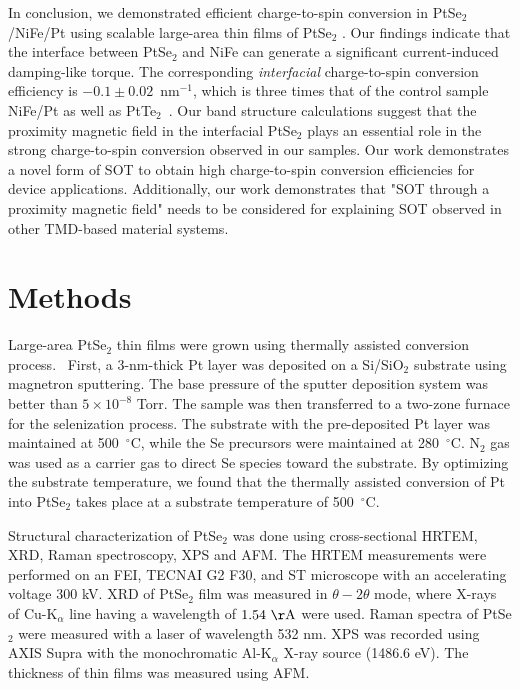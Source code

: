 \documentclass[journal=jacsat,manuscript=article]{achemso}
\begin{document}
In conclusion, we demonstrated efficient charge-to-spin conversion in PtSe$_{2}$/NiFe/Pt using scalable large-area thin films of PtSe$_{2}$ .
Our findings indicate that the interface between PtSe$_{2}$ and NiFe can generate a significant current-induced damping-like torque. The corresponding \textit{interfacial} charge-to-spin conversion efficiency is $-0.1\pm 0.02$~nm$^{-1}$, which is three times that of the control sample NiFe/Pt as well as PtTe$_2$~\cite{xu2020high}. Our band structure calculations suggest that the proximity magnetic field in the interfacial PtSe$_2$ plays an essential role in the strong charge-to-spin conversion observed in our samples. Our work demonstrates a novel form of SOT to obtain high charge-to-spin conversion efficiencies for device applications. Additionally, our work demonstrates that "SOT through a proximity magnetic field" needs to be considered for explaining SOT observed in other TMD-based material systems.

\section{Methods}
Large-area PtSe$_{2}$ thin films were grown using thermally assisted conversion process.~\cite{jakhar2020optically} First, a 3-nm-thick Pt layer was deposited on a Si/SiO$_2$ substrate using magnetron sputtering. The base pressure of the sputter deposition system was better than $5\times10^{-8}$ Torr. The sample was then transferred to a two-zone furnace for the selenization process. The substrate with the pre-deposited Pt layer was maintained at 500~$^{\circ}$C, while the Se precursors were maintained at 280~$^{\circ}$C. N$_2$ gas was used as a carrier gas to direct Se species toward the substrate. By optimizing the substrate temperature, we found that the thermally assisted conversion of Pt into PtSe$_{2}$ takes place at a substrate temperature of 500~$^{\circ}$C.~\cite{jakhar2020optically}


Structural characterization of PtSe$_2$ was done using cross-sectional HRTEM, XRD, Raman spectroscopy, XPS and AFM. The HRTEM measurements were performed on an FEI, TECNAI G2 F30, and ST microscope with an accelerating voltage 300 kV. XRD of PtSe$_2$ film was measured in $\theta-2\theta$ mode, where X-rays of Cu-K$_\alpha$ line having a wavelength of $1.54~\mathrm{\AA}$ were used. Raman spectra of PtSe$_2$ were measured with a laser of wavelength 532 nm. XPS was recorded using AXIS Supra with the monochromatic Al-K$_\alpha$ X-ray source (1486.6 eV). The thickness of thin films was measured using AFM.
\end{document}
